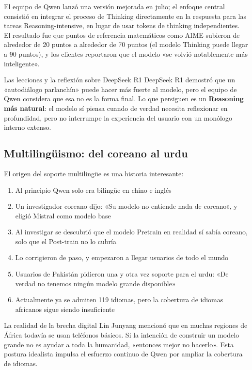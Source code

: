 El equipo de Qwen lanzó una versión mejorada en julio; el enfoque central consistió en integrar el proceso de Thinking directamente en la respuesta para las tareas Reasoning-intensive, en lugar de usar tokens de thinking independientes. El resultado fue que puntos de referencia matemáticos como AIME subieron de alrededor de 20 puntos a alrededor de 70 puntos (el modelo Thinking puede llegar a 90 puntos), y los clientes reportaron que el modelo «se volvió notablemente más inteligente».

\begin{knowledgebox}{Las lecciones y la reflexión sobre DeepSeek R1}
DeepSeek R1 demostró que un «autodiálogo parlanchín» puede hacer más fuerte al modelo, pero el equipo de Qwen considera que esa no es la forma final. Lo que persiguen es un \textbf{Reasoning más natural}: el modelo sí piensa cuando de verdad necesita reflexionar en profundidad, pero no interrumpe la experiencia del usuario con un monólogo interno extenso.
\end{knowledgebox}

\subsection{Multilingüismo: del coreano al urdu}

El origen del soporte multilingüe es una historia interesante:

\begin{enumerate}
    \item Al principio Qwen solo era bilingüe en chino e inglés
    \item Un investigador coreano dijo: «Su modelo no entiende nada de coreano», y eligió Mistral como modelo base
    \item Al investigar se descubrió que el modelo Pretrain en realidad sí sabía coreano, solo que el Post-train no lo cubría
    \item Lo corrigieron de paso, y empezaron a llegar usuarios de todo el mundo
    \item Usuarios de Pakistán pidieron una y otra vez soporte para el urdu: «De verdad no tenemos ningún modelo grande disponible»
    \item Actualmente ya se admiten 119 idiomas, pero la cobertura de idiomas africanos sigue siendo insuficiente
\end{enumerate}

\begin{warningbox}{La realidad de la brecha digital}
Lin Junyang mencionó que en muchas regiones de África todavía se usan teléfonos básicos. Si la intención de construir un modelo grande no es ayudar a toda la humanidad, «entonces mejor no hacerlo». Esta postura idealista impulsa el esfuerzo continuo de Qwen por ampliar la cobertura de idiomas.
\end{warningbox}


